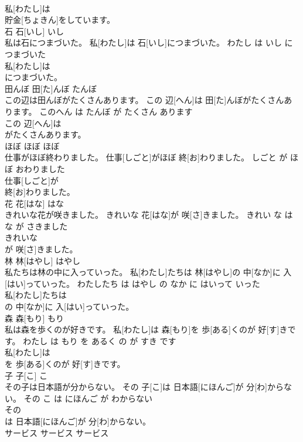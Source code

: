 \documentclass[8pt]{extreport}
\begin{document}
\begin{CJK}{UTF8}{min}
\\	私[わたし]は
\\	貯金[ちょきん]をしています。			
\\	石	石[いし]	いし	
\\	私は石につまづいた。	私[わたし]は 石[いし]につまづいた。	わたし は いし に つまづいた	
\\	私[わたし]は
\\	につまづいた。			
\\	田んぼ	田[た]んぼ	たんぼ	
\\	この辺は田んぼがたくさんあります。	この 辺[へん]は 田[た]んぼがたくさんあります。	このへん は たんぼ が たくさん あります	
\\	この 辺[へん]は
\\	がたくさんあります。			
\\	ほぼ	ほぼ	ほぼ	
\\	仕事がほぼ終わりました。	仕事[しごと]がほぼ 終[お]わりました。	しごと が ほぼ おわりました	
\\	仕事[しごと]が
\\	終[お]わりました。			
\\	花	花[はな]	はな	
\\	きれいな花が咲きました。	きれいな 花[はな]が 咲[さ]きました。	きれい な はな が さきました	
\\	きれいな
\\	が 咲[さ]きました。			
\\	林	林[はやし]	はやし	
\\	私たちは林の中に入っていった。	私[わたし]たちは 林[はやし]の 中[なか]に 入[はい]っていった。	わたしたち は はやし の なか に はいって いった	
\\	私[わたし]たちは
\\	の 中[なか]に 入[はい]っていった。			
\\	森	森[もり]	もり	
\\	私は森を歩くのが好きです。	私[わたし]は 森[もり]を 歩[ある]くのが 好[す]きです。	わたし は もり を あるく の が すき です	
\\	私[わたし]は
\\	を 歩[ある]くのが 好[す]きです。			
\\	子	子[こ]	こ	
\\	その子は日本語が分からない。	その 子[こ]は 日本語[にほんご]が 分[わ]からない。	その こ は にほんご が わからない	
\\	その
\\	は 日本語[にほんご]が 分[わ]からない。			
\\	サービス	サービス	サービス	

\end{CJK}
\end{document}
